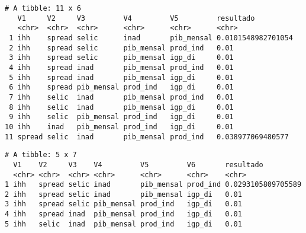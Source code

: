 \documentclass[]{article}
\begin{document}
\begin{verbatim}
# A tibble: 11 x 6
   V1     V2     V3         V4         V5         resultado         
   <chr>  <chr>  <chr>      <chr>      <chr>      <chr>             
 1 ihh    spread selic      inad       pib_mensal 0.0101548982701054
 2 ihh    spread selic      pib_mensal prod_ind   0.01              
 3 ihh    spread selic      pib_mensal igp_di     0.01              
 4 ihh    spread inad       pib_mensal prod_ind   0.01              
 5 ihh    spread inad       pib_mensal igp_di     0.01              
 6 ihh    spread pib_mensal prod_ind   igp_di     0.01              
 7 ihh    selic  inad       pib_mensal prod_ind   0.01              
 8 ihh    selic  inad       pib_mensal igp_di     0.01              
 9 ihh    selic  pib_mensal prod_ind   igp_di     0.01              
10 ihh    inad   pib_mensal prod_ind   igp_di     0.01              
11 spread selic  inad       pib_mensal prod_ind   0.038977069480577 
\end{verbatim}

\begin{verbatim}
# A tibble: 5 x 7
  V1    V2     V3    V4         V5         V6       resultado         
  <chr> <chr>  <chr> <chr>      <chr>      <chr>    <chr>             
1 ihh   spread selic inad       pib_mensal prod_ind 0.0293105809705589
2 ihh   spread selic inad       pib_mensal igp_di   0.01              
3 ihh   spread selic pib_mensal prod_ind   igp_di   0.01              
4 ihh   spread inad  pib_mensal prod_ind   igp_di   0.01              
5 ihh   selic  inad  pib_mensal prod_ind   igp_di   0.01              
\end{verbatim}
\end{document}
